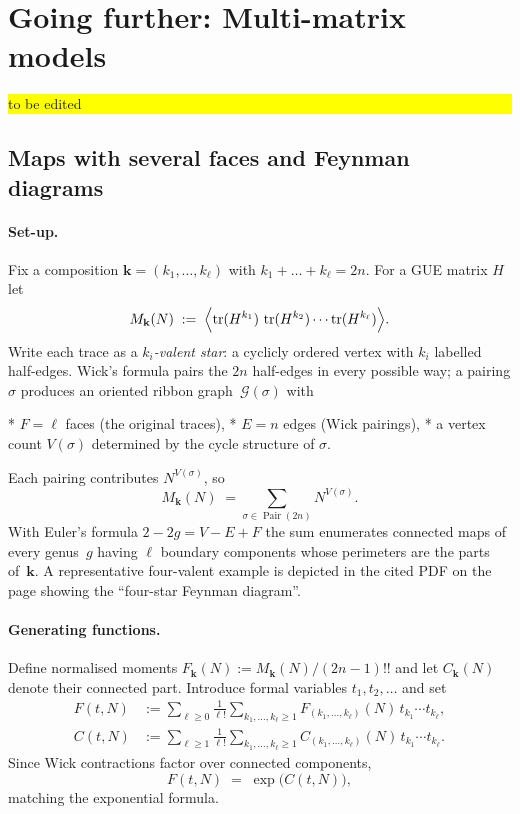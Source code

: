 \documentclass[letterpaper,11pt,oneside,reqno]{article}
\numberwithin{equation}{section}
\theoremstyle{definition}
\begin{document}
\section{Going further: Multi-matrix models}

\colorbox{yellow}{\parbox{.7\textwidth}{to be edited}}

\subsection{Maps with several faces and Feynman diagrams}
\label{subsec:feynman-multifaces}

\paragraph{Set-up.}
Fix a composition $\mathbf k=(k_1,\dots,k_\ell)$ with
$k_1+\dots+k_\ell=2n$.
For a GUE matrix $H$ let
\[
  M_{\mathbf k}(N)
  \;:=\;
  \Bigl\langle
    \operatorname{tr}(H^{k_1})\,
    \operatorname{tr}(H^{k_2})\cdots
    \operatorname{tr}(H^{k_\ell})
  \Bigr\rangle .
\]
Write each trace as a \emph{$k_i$-valent star}: a cyclicly ordered vertex
with $k_i$ labelled half-edges.
Wick’s formula pairs the $2n$ half-edges in every possible way; a
pairing $\sigma$ produces an oriented ribbon graph~$\mathcal G(\sigma)$
with

* $F=\ell$ faces (the original traces),
* $E=n$ edges (Wick pairings),
* a vertex count $V(\sigma)$ determined by the cycle structure of
  $\sigma$.

Each pairing contributes $N^{V(\sigma)}$, so
\[
  M_{\mathbf k}(N)\;=\!\!\!\sum_{\sigma\in\operatorname{Pair}(2n)}\!\!\! N^{V(\sigma)}.
\]
With Euler’s formula $2-2g=V-E+F$ the sum
enumerates connected maps of every genus~$g$ having
$\ell$ boundary components whose perimeters are the parts of~$\mathbf k$.
A representative four-valent example is depicted in the cited PDF on the
page showing the “four-star Feynman diagram”.

\paragraph{Generating functions.}
Define normalised moments
$
  F_{\mathbf k}(N):=M_{\mathbf k}(N)/(2n-1)!!
$
and let $C_{\mathbf k}(N)$ denote their connected part.
Introduce formal variables $t_1,t_2,\dots$ and set
\begin{align*}
  F(t,N)
    &:=\sum_{\ell\ge0}\frac{1}{\ell!}
       \!\!\!\sum_{k_1,\dots,k_\ell\ge1}
       \!\!\!F_{(k_1,\dots,k_\ell)}(N)\,t_{k_1}\cdots t_{k_\ell},\\
  C(t,N)
    &:=\sum_{\ell\ge1}\frac{1}{\ell!}
       \!\!\!\sum_{k_1,\dots,k_\ell\ge1}
       \!\!\!C_{(k_1,\dots,k_\ell)}(N)\,t_{k_1}\cdots t_{k_\ell}.
\end{align*}
Since Wick contractions factor over connected components,
\[
   F(t,N)\;=\;\exp\bigl(C(t,N)\bigr),
\]
matching the exponential formula.
\end{document}

